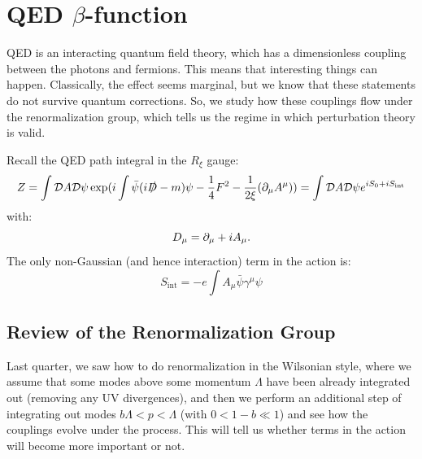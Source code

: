 \section{QED $\beta$-function}
QED is an interacting quantum field theory, which has a dimensionless coupling between the photons and fermions. This means that interesting things can happen. Classically, the effect seems marginal, but we know that these statements do not survive quantum corrections. So, we study how these couplings flow under the renormalization group, which tells us the regime in which perturbation theory is valid.

Recall the QED path integral in the $R_\xi$ gauge:
\begin{equation}
    Z = \int \mathcal{D}A\mathcal{D}\psi \exp(i\int \bar{\psi}(i\slashed{D} - m)\psi - \frac{1}{4}F^2 - \frac{1}{2\xi}(\partial_\mu A^\mu)) = \int \mathcal{D}A\mathcal{D}\psi e^{iS_0 + iS_{\text{int}}}
\end{equation}
with:
\begin{equation}
    D_\mu = \partial_\mu + iA_\mu.
\end{equation}
The only non-Gaussian (and hence interaction) term in the action is:
\begin{equation}
    S_{\text{int}} = -e\int A_\mu \bar{\psi}\gamma^\mu \psi
\end{equation}

\subsection{Review of the Renormalization Group}
Last quarter, we saw how to do renormalization in the Wilsonian style, where we assume that some modes above some momentum $\Lambda$ have been already integrated out (removing any UV divergences), and then we perform an additional step of integrating out modes $b\Lambda < p < \Lambda$ (with $0 < 1 - b \ll 1$) and see how the couplings evolve under the process. This will tell us whether terms in the action will become more important or not.

